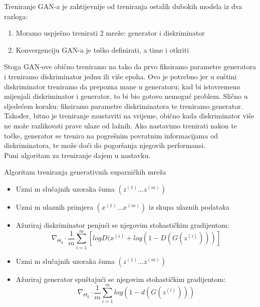 \noindent Treniranje GAN-a je zahtijevnije od treniranja ostalih dubokih modela iz dva razloga: 

\begin{enumerate}[label=(\alph*)]
\item Moramo uspješno trenirati 2 mreže: generator i diskriminator
\item Konvergenciju GAN-a je teško definirati, a time i otkriti
\end{enumerate}

Stoga GAN-ove obično treniramo na tako da prvo fiksiramo parametre generatora i treniramo diskriminator jednu ili više epoha. Ovo je potrebno jer u suštini diskriminator treniramo da prepozna mane u generatoru; kad bi istovremeno mijenjali diskriminator i generator, to bi bio gotovo nemoguć problem. Slično u sljedećem koraku: fiksiramo parametre diskriminatora te treniramo generator. Također, bitno je treniranje zaustaviti na vrijeme, obično kada diskriminator više ne može razlikovati prave ulaze od lažnih. Ako nastavimo trenirati nakon te točke, generator se trenira na pogrešnim povratnim informacijama od diskriminatora, te može doći do pogoršanja njegovih performansi. \\

\noindent Puni algoritam za treniranje dajem u nastavku.

\begin{algorithm}
  \caption{Algoritam treniranja generativnih suparničkih mreža}
  \begin{algorithmic}
            \begin{itemize}
              \item Uzmi m slučajnih uzoraka šuma ${(z^{(1)}...z^{(m)})}$
              \item Uzmi m ulaznih primjera ${(x^{(1)}...x^{(m)})}$ iz skupa ulaznih podataka
              \item Ažuriraj diskriminator penjući se njegovim stohastičkim gradijentom: 
              $$\nabla_{ \Theta _{d}} \cdot\frac{1}{m}  \sum\limits_{i=1}^m [log D(x^{(i)} + log(1-D(G(z^{(i)})))]$$
            \end{itemize}
        \EndFor
            \begin{itemize}
              \item Uzmi m slučajnih uzoraka šuma ${(z^{(1)}...z^{(m)})}$
              \item Ažuriraj generator spuštajući se njegovim stohastičkim gradijentom: 
              $$\nabla_{ \Theta _{g}} \cdot\frac{1}{m}  \sum\limits_{i=1}^m log(1-d(G(z^{(i)})))$$
            \end{itemize}
        \EndFor
 \end{algorithmic}
\end{algorithm}

